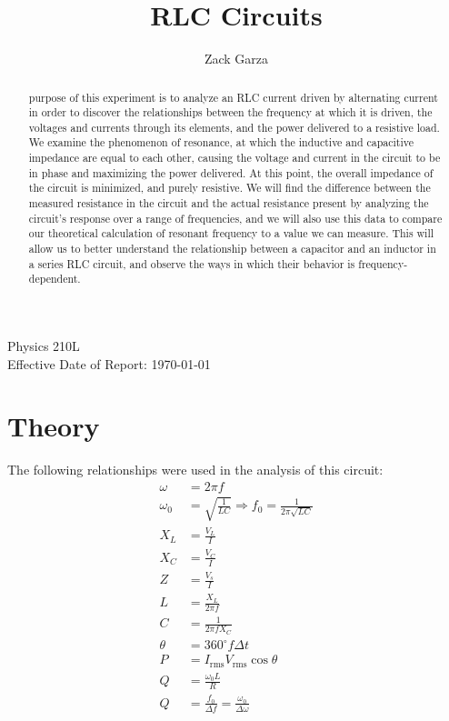 \documentclass[twocolumn,english]{IEEEtran}
\newcommand{\thetitle}{RLC Circuits}
\newcommand{\theauthors}{Zack Garza}
\newcommand{\theclass}{Physics 210L}
\theoremstyle{plain}
\theoremstyle{plain}
\begin{document}
\title{\thetitle}
\author{\theauthors}
\IEEEspecialpapernotice
{\theclass \\ Effective Date of Report: \today }
\markboth{\thetitle}{\theauthors}
\maketitle

\begin{abstract}
 purpose of this experiment is to analyze an RLC current driven by alternating current in order to discover the relationships between the frequency at which it is driven, the voltages and currents through its elements, and the power delivered to a resistive load. We examine the phenomenon of resonance, at which the inductive and capacitive impedance are equal to each other, causing the voltage and current in the circuit to be in phase and maximizing the power delivered. At this point, the overall impedance of the circuit is minimized, and purely resistive. We will find the difference between the measured resistance in the circuit and the actual resistance present by analyzing the circuit's response over a range of frequencies, and we will also use this data to compare our theoretical calculation of resonant frequency to a value we can measure. This will allow us to better understand the relationship between a capacitor and an inductor in a series RLC circuit, and observe the ways in which their behavior is frequency-dependent.
\end{abstract}

\tableofcontents

\section{Theory}

The following relationships were used in the analysis of this circuit:
\begin{align*}
	\omega &= 2\pi f \\
	\omega_0 &= \sqrt{\frac{1}{LC}} \Rightarrow f_0 = \frac{1}{2\pi\sqrt{LC}}\\
	X_L &= \frac{V_L}{I} \\
	X_C &= \frac{V_C}{I} \\
	Z &= \frac{V_s}{I} \\
	L &= \frac{X_L}{2\pi f} \\
	C &= \frac{1}{2\pi f X_C} \\
	\theta &= 360^{\circ} f\Delta t \\
	P &= I_{\text{rms}} V_{\text{rms}} \cos\theta \\
	Q &= \frac{\omega_0 L}{R} \\
	Q &= \frac{f_0}{\Delta f} = \frac{\omega_0}{\Delta \omega}
\end{align*}
\end{document}
